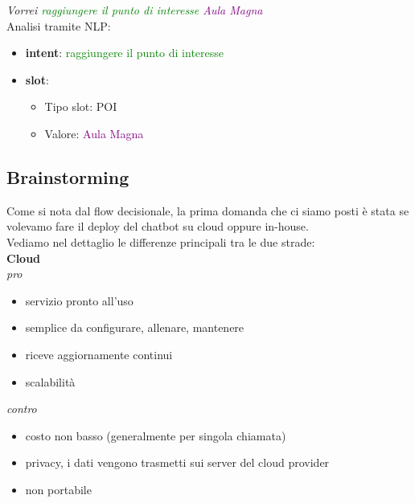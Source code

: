 \begin{figure}[htp]
\end{figure}

\textit{Vorrei \textcolor{green}{raggiungere il punto di interesse} \textcolor{purple}{Aula Magna}}\\
Analisi tramite NLP:
\begin{itemize}
\item \textbf{intent}: \textcolor{green}{raggiungere il punto di interesse}
\item \textbf{slot}: 
\begin{itemize}
    \item Tipo slot: POI
    \item Valore: \textcolor{purple}{Aula Magna}
\end{itemize}
\end{itemize}
    
\subsection{Brainstorming}
\begin{figure}[htp]
    \centering  
\end{figure}


Come si nota dal flow decisionale, la prima domanda che ci siamo posti è stata se volevamo fare il deploy del
chatbot su cloud oppure in-house.\\

Vediamo nel dettaglio le differenze principali tra le due strade:\\
\textbf{Cloud}\\
\textit{pro}\\
\begin{itemize}
    \item servizio pronto all'uso
    \item semplice da configurare, allenare, mantenere
    \item riceve aggiornamente continui
    \item scalabilità
\end{itemize}
\textit{contro}
\begin{itemize}
    \item costo non basso (generalmente per singola chiamata)
    \item privacy, i dati vengono trasmetti sui server del cloud provider
    \item non portabile
\end{itemize}
